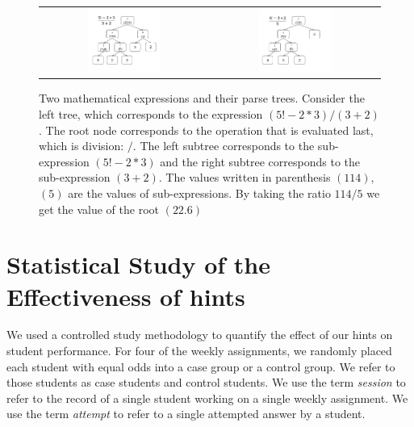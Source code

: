 \documentclass{llncs2e/llncs}
\begin{document}
\begin{figure}
  \centering
   \begin{tabular}{c c}
		\includegraphics[width=0.45\textwidth]{image/ParseTrees1.png} &
		\includegraphics[width=0.45\textwidth]{image/ParseTrees2.png}
	\end{tabular}
   \caption{Two mathematical expressions and their parse trees. Consider the left tree, which corresponds to the expression $(5!-2*3)/(3+2)$. The root node corresponds to the operation that is evaluated last, which is division: $/$. The left subtree corresponds to the sub-expression $(5!-2*3)$ and the right subtree corresponds to the sub-expression $(3+2)$. The values written in parenthesis $(114)$,$(5)$ are the values of sub-expressions. By taking the ratio $114/5$ we get the value of the root $(22.6)$}
   \label{fig:parse_tree}
\end{figure}

\section{Statistical Study of the Effectiveness of hints}

We used a controlled study methodology to quantify the effect of our hints on student performance. For four of the weekly assignments, we randomly placed each student with equal odds into a case group or a control group. We refer to those students as case students and control students.  We use the term {\em session} to refer to the record of a single student working on a single weekly assignment. We use the term {\em attempt} to refer to a single attempted answer by a student.
\end{document}
